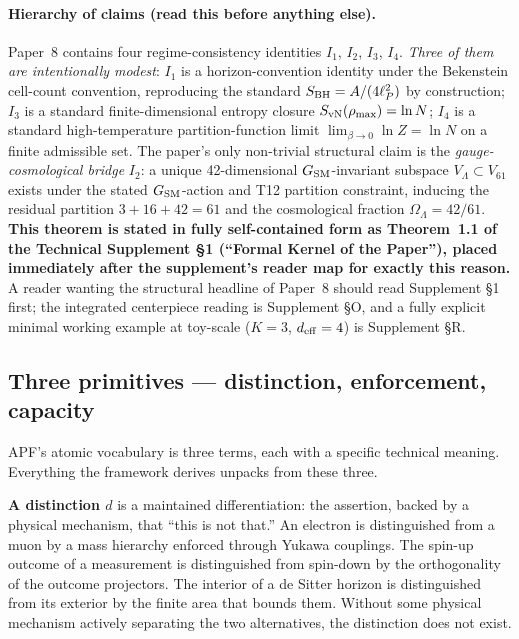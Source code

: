 \documentclass[11pt]{article}
\begin{document}
\paragraph{Hierarchy of claims (read this before anything else).}  Paper~8 contains four regime-consistency identities $I_1$, $I_2$, $I_3$, $I_4$.  \emph{Three of them are intentionally modest}: $I_1$ is a horizon-convention identity under the Bekenstein cell-count convention, reproducing the standard $S_{\rm BH} = A/(4\ell_P^2)$ by construction; $I_3$ is a standard finite-dimensional entropy closure $S_{\rm vN}(\rho_{\rm max}) = \ln N$; $I_4$ is a standard high-temperature partition-function limit $\lim_{\beta\to 0}\ln Z = \ln N$ on a finite admissible set.  The paper's only non-trivial structural claim is the \emph{gauge-cosmological bridge} $I_2$: a unique 42-dimensional $G_{\rm SM}$-invariant subspace $V_\Lambda \subset V_{61}$ exists under the stated $G_{\rm SM}$-action and T12 partition constraint, inducing the residual partition $3+16+42=61$ and the cosmological fraction $\Omega_\Lambda = 42/61$.  \textbf{This theorem is stated in fully self-contained form as Theorem~1.1 of the Technical Supplement \S1 (``Formal Kernel of the Paper''), placed immediately after the supplement's reader map for exactly this reason.}  A reader wanting the structural headline of Paper~8 should read Supplement \S1 first; the integrated centerpiece reading is Supplement \S O, and a fully explicit minimal working example at toy-scale ($K=3$, $d_{\rm eff}=4$) is Supplement \S R.

\subsection{Three primitives --- distinction, enforcement, capacity}\label{sec:intro_primitives}

APF's atomic vocabulary is three terms, each with a specific technical meaning. Everything the framework derives unpacks from these three.

\smallskip
\noindent\textbf{A distinction $d$} is a maintained differentiation: the assertion, backed by a physical mechanism, that ``this is not that.'' An electron is distinguished from a muon by a mass hierarchy enforced through Yukawa couplings. The spin-up outcome of a measurement is distinguished from spin-down by the orthogonality of the outcome projectors. The interior of a de Sitter horizon is distinguished from its exterior by the finite area that bounds them. Without some physical mechanism actively separating the two alternatives, the distinction does not exist.
\end{document}
